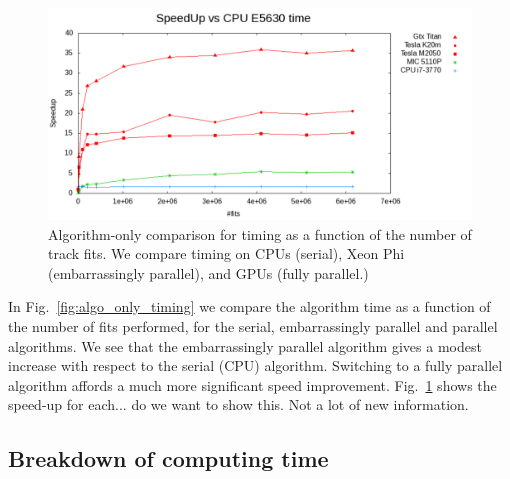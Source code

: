 \documentclass[letterpaper]{jpconf}
\begin{document}
%
%
 \begin{figure}[tbp]
   \centering
   \includegraphics[width=0.5\linewidth]{figures/Speedup_MIC.pdf}
   \caption{Algorithm-only comparison for timing as a function of the
     number of track fits. We compare timing on CPUs (serial), Xeon Phi
     (embarrassingly parallel), and GPUs (fully parallel.) }
   \label{fig:algo_only_speedup}
 \end{figure}


In Fig.~\ref{fig:algo_only_timing} we compare the algorithm time as a
function of the number of fits performed, for the serial,
embarrassingly parallel and parallel algorithms. We see that the
embarrassingly parallel algorithm gives a modest increase with respect
to the serial (CPU) algorithm. Switching to a fully parallel algorithm
affords a much more significant speed
improvement. Fig.~\ref{fig:algo_only_speedup} shows the speed-up for
each... do we want to show this. Not a lot of new information.

\subsection{Breakdown of computing time}
\end{document}
